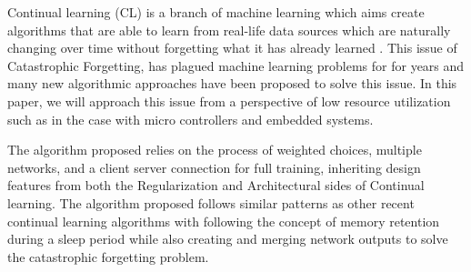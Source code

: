 
\indent Continual learning (CL) is a branch of machine learning which aims create algorithms that are able to learn from real-life data sources which are naturally changing over time without forgetting what it has already learned \cite{lesort2020continual}. This issue of Catastrophic Forgetting, has plagued machine learning problems for for years and many new algorithmic approaches have been proposed to solve this issue. In this paper, we will approach this issue from a perspective of low resource utilization such as in the case with micro controllers and embedded systems.

\indent The algorithm proposed relies on the process of weighted choices, multiple networks, and a client server connection for full training, inheriting design features from both the Regularization and Architectural sides of Continual learning.\cite{DBLP:journals/corr/abs-1907-00182} The algorithm proposed follows similar patterns as other recent continual learning algorithms with following the concept of memory retention during a sleep period while also creating and merging network outputs to solve the catastrophic forgetting problem. 



